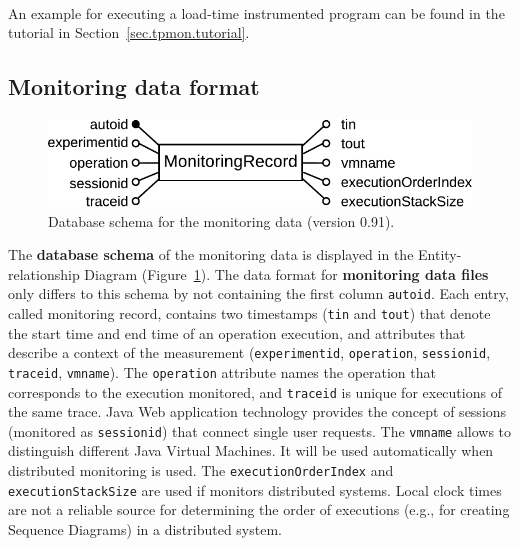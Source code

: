 \documentclass[a4paper,12pt]{scrartcl}
\begin{document}
\

An example for executing a load-time instrumented program can be found in the tutorial in Section~\ref{sec.tpmon.tutorial}.

\subsection{Monitoring data format}\label{sec.monitoring.data.format}

\begin{figure}
 \centering
 \includegraphics[width=0.8\columnwidth]{08-05-06-monitoringDataFormat}
 \caption{Database schema for the monitoring data (version 0.91).}
 \label{databaseSchema}
\end{figure}

The \textbf{database schema} of the monitoring data is displayed in the Entity-relationship Diagram (Figure~\ref{databaseSchema}). The data format for \textbf{monitoring data files} only differs to this schema by not containing the first column \texttt{autoid}. Each entry, called monitoring record, contains two timestamps (\texttt{tin} and \texttt{tout}) that denote the start time and end time of an operation execution, and attributes that describe a context of the measurement (\texttt{experimentid}, \texttt{operation}, \texttt{sessionid}, \texttt{traceid}, \texttt{vmname}). The \texttt{operation} attribute names the operation that corresponds to the execution monitored, and \texttt{traceid} is unique for executions of the same trace. %
 Java Web application technology provides the concept of sessions (monitored as \texttt{sessionid}) that connect single user requests. %
The \texttt{vmname} allows to distinguish different Java Virtual Machines. It will be used automatically when distributed monitoring is used. %
The \texttt{executionOrderIndex} and \texttt{executionStackSize} are used if \tpmon{} monitors distributed systems. Local clock times are not a reliable source for determining the order of executions (e.g., for creating Sequence Diagrams) in a distributed system.
\end{document}
